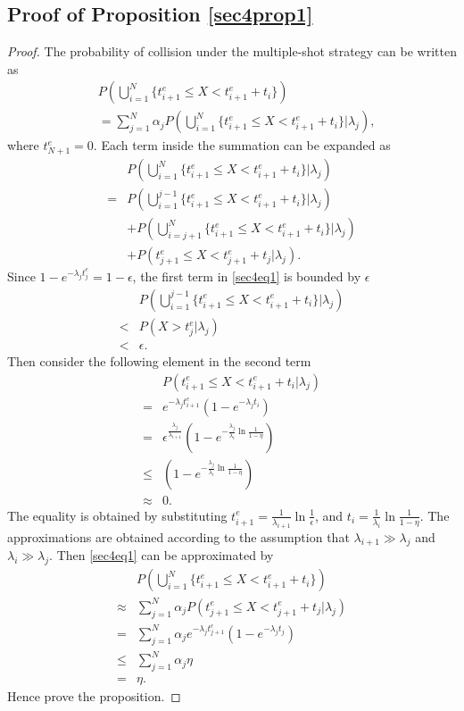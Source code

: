 \documentclass[10pt,final,journal,letterpaper]{IEEEtran}
\begin{document}
\subsection{Proof of Proposition \ref{sec4prop1}}
\begin{proof}
The probability of collision under the multiple-shot strategy can be written as
\begin{align}
    &P(\bigcup_{i=1}^{N}\{t_{i+1}^e\leq X<t_{i+1}^e+t_i\})\nonumber\\
    &=\sum_{j=1}^{N}\alpha_jP(\bigcup_{i=1}^{N}\{t_{i+1}^e\leq X<t_{i+1}^e+t_i\}|\lambda_j),\nonumber
\end{align}
where $t_{N+1}^e=0$. Each term inside the summation can be expanded as
\begin{align}\label{sec4eq1}
    &P(\bigcup_{i=1}^{N}\{t_{i+1}^e\leq X<t_{i+1}^e+t_i\}|\lambda_j)\nonumber\\
    =&P(\bigcup_{i=1}^{j-1}\{t_{i+1}^e\leq X<t_{i+1}^e+t_i\}|\lambda_j)\nonumber\\
    &+P(\bigcup_{i=j+1}^{N}\{t_{i+1}^e\leq X<t_{i+1}^e+t_i\}|\lambda_j)\nonumber\\
    &+P(t_{j+1}^e\leq X<t_{j+1}^e+t_j|\lambda_j).
\end{align}
Since $1-e^{-\lambda_{j}t_{j}^e}= 1-\epsilon$, the first term in \eqref{sec4eq1} is bounded by $\epsilon$
\begin{align}
    &P(\bigcup_{i=1}^{j-1}\{t_{i+1}^e\leq X<t_{i+1}^e+t_i\}|\lambda_j)\nonumber\\
    < & P(X>t_j^e|\lambda_j)\nonumber\\
    < & \epsilon.\nonumber
\end{align}
Then consider the following element in the second term
\begin{align}
    &P(t_{i+1}^e\leq X<t_{i+1}^e+t_i|\lambda_j)\nonumber\\
    =&e^{-\lambda_jt_{i+1}^e}(1-e^{-\lambda_jt_i})\nonumber\\
    =&\epsilon^{\frac{\lambda_j}{\lambda_{i+1}}}(1-e^{-\frac{\lambda_j}{\lambda_i}\ln\frac{1}{1-\eta}})\nonumber\\
    \leq & (1-e^{-\frac{\lambda_j}{\lambda_i}\ln\frac{1}{1-\eta}})\nonumber\\
    \approx & 0.\nonumber
\end{align}
The equality is obtained by substituting $t_{i+1}^e=\frac{1}{\lambda_{i+1}}\ln\frac{1}{\epsilon}$, and $t_i=\frac{1}{\lambda_{i}}\ln\frac{1}{1-\eta}$. The approximations are obtained according to the assumption that $\lambda_{i+1}\gg \lambda_j$ and $\lambda_i\gg \lambda_j$. Then \eqref{sec4eq1} can be approximated by
\begin{align}
    &P(\bigcup_{i=1}^{N}\{t_{i+1}^e\leq X<t_{i+1}^e+t_i\})\nonumber\\
    \approx & \sum_{j=1}^{N}\alpha_jP(t_{j+1}^e\leq X<t_{j+1}^e+t_j|\lambda_j)\nonumber\\
    =&\sum_{j=1}^{N}\alpha_je^{-\lambda_jt_{j+1}^e}(1-e^{-\lambda_jt_j})\nonumber\\
    \leq & \sum_{j=1}^{N}\alpha_j\eta\nonumber\\
    =&\eta.\nonumber
\end{align}
Hence prove the proposition.
\end{proof}

\ifCLASSOPTIONcaptionsoff
  \newpage
\fi



\end{document}
